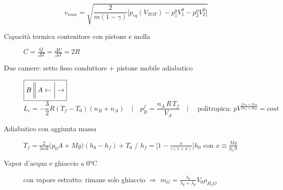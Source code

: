 \documentclass[10pt, oneside]{article}
\begin{document}
\begin{description}
\[v_{max} = \sqrt{\frac{2}{m(1-\gamma)} \bigg[p_{eq}(V_{TOT}) - p_1^0 V_1^0 - p_2^0 V_2^0\bigg]}\]
\item[Capacità termica contenitore con pistone e molla] $\displaystyle C = \frac{Q}{\Delta T} = \frac{\Delta U}{\Delta T} = 2 R$ 
\item[Due camere: setto fisso conduttore + pistone mobile adiabatico] $\boxed{ B \, \bigg{\|} \, A \leftarrow \bigg| \rightarrow }$ \\ \[L_e = - \frac{3}{2} R (T_f -T_0) (n_B + n_A) \quad \bigg| \quad p_B^f = \frac{n_A \, R \, T_f}{V_A} \quad \bigg| \quad \textrm{ politropica: } p V^{\frac{5n_A + 3n_B}{3 n_A + 3 n_B}} = cost\]
\item[Adiabatico con aggiunta massa] $\displaystyle T_f = \frac{2}{5nR} \bigg(p_0 A + M g\bigg) (h_0 - h_f) + T_0$ \bigg/ $\displaystyle h_f = \bigg[1 - \frac{x}{\gamma (1 + x)}\bigg] h_0$ con $\displaystyle x \equiv \frac{M g}{p_0 A}$
\item[Vapor d'acqua e ghiaccio a 0°C] con vapore estratto: rimane solo ghiaccio $\Rightarrow$ $\displaystyle m_G = \frac{\lambda_V}{\lambda_V + \lambda_F} V_0 \rho_{H_2O}$
\end{description}
\end{document}
